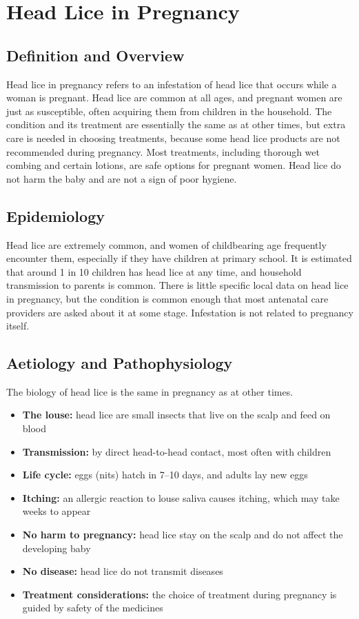 \chapter{Head Lice in Pregnancy}

\section*{Definition and Overview}
Head lice in pregnancy refers to an infestation of head lice that occurs while a woman is pregnant. Head lice are common at all ages, and pregnant women are just as susceptible, often acquiring them from children in the household. The condition and its treatment are essentially the same as at other times, but extra care is needed in choosing treatments, because some head lice products are not recommended during pregnancy. Most treatments, including thorough wet combing and certain lotions, are safe options for pregnant women. Head lice do not harm the baby and are not a sign of poor hygiene.

\section*{Epidemiology}
Head lice are extremely common, and women of childbearing age frequently encounter them, especially if they have children at primary school. It is estimated that around 1 in 10 children has head lice at any time, and household transmission to parents is common. There is little specific local data on head lice in pregnancy, but the condition is common enough that most antenatal care providers are asked about it at some stage. Infestation is not related to pregnancy itself.

\section*{Aetiology and Pathophysiology}
The biology of head lice is the same in pregnancy as at other times.

\begin{itemize}
    \item \textbf{The louse:} head lice are small insects that live on the scalp and feed on blood
    \item \textbf{Transmission:} by direct head-to-head contact, most often with children
    \item \textbf{Life cycle:} eggs (nits) hatch in 7--10 days, and adults lay new eggs
    \item \textbf{Itching:} an allergic reaction to louse saliva causes itching, which may take weeks to appear
    \item \textbf{No harm to pregnancy:} head lice stay on the scalp and do not affect the developing baby
    \item \textbf{No disease:} head lice do not transmit diseases
    \item \textbf{Treatment considerations:} the choice of treatment during pregnancy is guided by safety of the medicines
\end{itemize}

